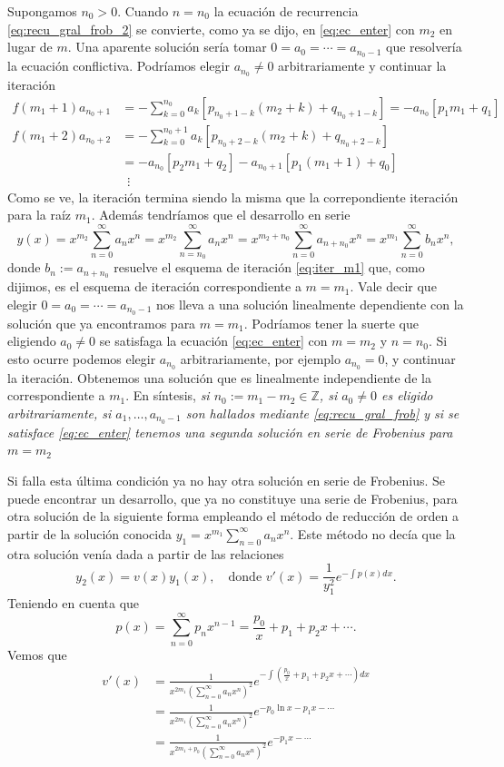 Supongamos $n_0>0$.  Cuando $n=n_0$ la ecuación de recurrencia  \eqref{eq:recu_gral_frob_2} se convierte, como ya se dijo, en \eqref{eq:ec_enter} con $m_2$ en lugar de $m$.\label{pag:apar_sol} Una aparente solución sería tomar  $0=a_0=\cdots=a_{n_0-1}$ que resolvería la ecuación conflictiva. Podríamos elegir $a_{n_0}\neq 0$ arbitrariamente y continuar la iteración
\begin{equation}\label{eq:iter_m1}
  \begin{split}
    f(m_1+1)a_{n_0+1}&=-\sum_{k=0}^{n_0}a_k\left[p_{n_0+1-k}(m_2+k) + q_{n_0+1-k}\right]=-a_{n_0}[p_1m_1+q_1]\\
   f(m_1+2) a_{n_0+2}&=-\sum_{k=0}^{n_0+1}a_k\left[p_{n_0+2-k}(m_2+k) + q_{n_0+2-k}\right]\\
                   &=-a_{n_0}[p_2m_1+q_2]-a_{n_0+1}[p_1(m_1+1)+q_0]\\
                   &\,\,\,\vdots
  \end{split}
\end{equation}
Como se ve, la iteración termina siendo la misma que la correpondiente iteración para la raíz $m_1$. Además tendríamos que el desarrollo en serie
\[y(x)=x^{m_2}\sum_{n=0}^{\infty}a_nx^n=x^{m_2}\sum_{n=n_0}^{\infty}a_nx^n
 =x^{m_2+n_0}\sum_{n=0}^{\infty}a_{n+n_0}x^n
=x^{m_1}\sum_{n=0}^{\infty}b_nx^n
,\]
donde $b_n:=a_{n+n_0}$ resuelve el esquema de iteración \eqref{eq:iter_m1} que, como dijimos, es el esquema de iteración correspondiente a $m=m_1$. Vale decir que elegir  $0=a_0=\cdots=a_{n_0-1}$ nos lleva a una solución linealmente dependiente con la solución que ya encontramos para $m=m_1$. Podríamos tener la suerte que eligiendo $a_0\neq 0$ se satisfaga la ecuación \eqref{eq:ec_enter} con $m=m_2$ y $n=n_0$. Si esto ocurre podemos elegir $a_{n_0}$ arbitrariamente, por ejemplo $a_{n_0}=0$, y continuar la iteración. Obtenemos una solución que es linealmente independiente   de la correspondiente a $m_1$. En síntesis, \emph{si $n_0:=m_1-m_2\in\mathbb{Z}$, si $a_0\neq 0$ es eligido arbitrariamente, si  $a_1,\ldots,a_{n_0-1}$ son hallados mediante \eqref{eq:recu_gral_frob} y si se satisface  \eqref{eq:ec_enter} tenemos una segunda solución en serie de Frobenius para $m=m_2$}

Si falla esta última condición ya no hay otra solución en serie de Frobenius. Se puede encontrar un desarrollo, que ya no constituye una serie de Frobenius,  para otra solución de la siguiente forma empleando el método de reducción de orden a partir de la solución conocida $y_1=x^{m_1}\sum_{n=0}^{\infty}a_nx^n$. Este método no decía que la otra solución venía dada a partir de las relaciones
\[y_2(x)=v(x)y_1(x),\quad\text{donde  } v'(x)=\frac{1}{y_1^2}e^{-\int p(x)dx}.\]
Teniendo en cuenta que
\[p(x)=\sum_{n=0}^{\infty}p_nx^{n-1}=\frac{p_0}{x}+p_1+p_2x+\cdots.\]
Vemos que
\[
   \begin{split}
     v'(x)&=\frac{1}{x^{2m_1}\left(\sum_{n=0}^{\infty}a_nx^n\right)^2}e^{-\int \left(\frac{p_0}{x}+p_1+p_2x+\cdots \right)dx}\\
  &= \frac{1}{x^{2m_1}\left(\sum_{n=0}^{\infty}a_nx^n\right)^2}e^{-p_0 \ln x -p_1x-\cdots }\\
  &= \frac{1}{x^{2m_1+p_0}\left(\sum_{n=0}^{\infty}a_nx^n\right)^2}e^{ -p_1x-\cdots }
   \end{split}
\]

